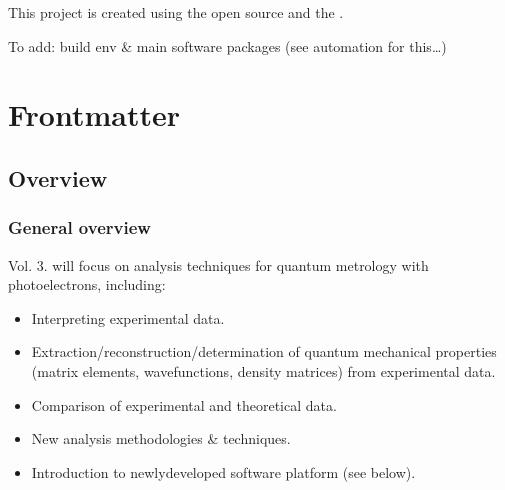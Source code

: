\documentclass[letterpaper,10pt,english]{jupyterBook}
\begin{document}
\begin{DUlineblock}{0em}
\item[] 
\end{DUlineblock}

\sphinxAtStartPar
This project is created using the open source  and the .

\sphinxAtStartPar
To add: build env \& main software packages (see automation for this…)

\sphinxAtStartPar
{}

\sphinxstepscope


\part{Frontmatter}

\sphinxstepscope


\chapter{Overview}
\label{\detokenize{frontmatter/overview_270122:overview}}\label{\detokenize{frontmatter/overview_270122::doc}}

\section{General overview}
\label{\detokenize{frontmatter/overview_270122:general-overview}}
\sphinxAtStartPar
Vol. 3. will focus on analysis techniques for quantum metrology with photoelectrons, including:
\begin{itemize}
\item {} 
\sphinxAtStartPar
Interpreting experimental data.

\item {} 
\sphinxAtStartPar
Extraction/reconstruction/determination of quantum mechanical properties (matrix elements, wavefunctions, density matrices) from experimental data.

\item {} 
\sphinxAtStartPar
Comparison of experimental and theoretical data.

\item {} 
\sphinxAtStartPar
New analysis methodologies \& techniques.

\item {} 
\sphinxAtStartPar
Introduction to newly\sphinxhyphen{}developed software platform (see below).

\end{itemize}
\end{document}
